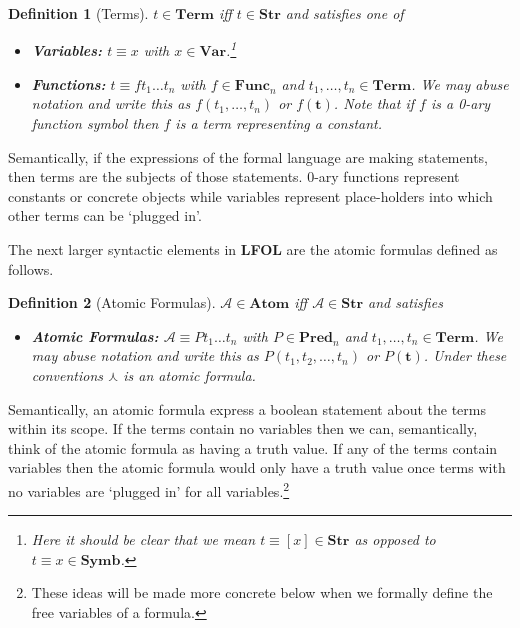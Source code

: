\documentclass[12pt]{article}
\theoremstyle{break}
\newtheorem{definition}{Definition}[section]
\theoremstyle{break}
\theoremstyle{break}
\theoremstyle{break}
\theoremstyle{break}
\newtheorem{informal definition}[definition]{Informal Definition}
\newcommand{\bv}[1]{\boldsymbol{#1}}
\newcommand{\mc}[1]{\mathcal{#1}}
\begin{document}
\begin{definition}[Terms]
$t \in \textbf{Term}$ iff $t \in \textbf{Str}$ and satisfies one of
\begin{itemize}
\item{\textbf{Variables:} $t\equiv x$ with $x \in \textbf{Var}$.\footnote{Here it should be clear that we mean $t\equiv [x]\in\textbf{Str}$ as opposed to $t\equiv x \in \textbf{Symb}$.}}
\item{\textbf{Functions:} $t \equiv ft_1 \ldots t_n$ with $f \in \textbf{Func}_n$ and $t_1, \ldots, t_n \in \textbf{Term}$. We may abuse notation and write this as $f(t_1, \ldots, t_n)$ or $f(\bv{t})$. Note that if $f$ is a 0-ary function symbol then $f$ is a term representing a constant.}
\end{itemize}
\end{definition}

Semantically, if the expressions of the formal language are making statements, then terms are the subjects of those statements.
0-ary functions represent constants or concrete objects while variables represent place-holders into which other terms can be `plugged in'.

The next larger syntactic elements in \textbf{LFOL} are the atomic formulas defined as follows.

\begin{definition}[Atomic Formulas]
$\mc{A} \in \textbf{Atom}$ iff $\mc{A} \in \textbf{Str}$ and satisfies

\begin{itemize}
\item{\textbf{Atomic Formulas:} $\mc{A} \equiv Pt_1\ldots t_n$ with $P\in \textbf{Pred}_n$ and $t_1, \ldots, t_n \in \textbf{Term}$. We may abuse notation and write this as $P(t_1,t_2,\ldots,t_n)$ or $P(\bv{t})$. Under these conventions $\curlywedge$ is an atomic formula.}
\end{itemize}
\end{definition}

Semantically, an atomic formula express a boolean statement about the terms within its scope.
If the terms contain no variables then we can, semantically, think of the atomic formula as having a truth value.
If any of the terms contain variables then the atomic formula would only have a truth value once terms with no variables are `plugged in' for all variables.\footnote{These ideas will be made more concrete below when we formally define the free variables of a formula.}
\end{document}
